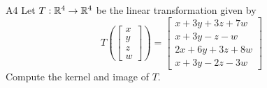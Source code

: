 \documentclass{sbgLAquiz}
\begin{document}
\begin{extract}\newpage\end{extract}
\begin{problem}{A4}
Let $T: \mathbb{R}^4\rightarrow \mathbb{R}^4$ be the linear transformation given by $$T\left(\begin{bmatrix} x \\ y \\ z \\ w \end{bmatrix} \right) = \begin{bmatrix} x+3y+3z+7w \\ x+3y-z-w \\ 2x+6y+3z+8w \\ x+3y-2z-3w \end{bmatrix}$$
Compute the kernel and image of $T$.
\end{problem}
\end{document}

